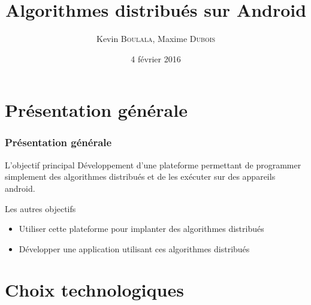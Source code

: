 \documentclass{beamer}
\title{Algorithmes distribués sur Android}
\author{Kevin \textsc{Boulala}, Maxime \textsc{Dubois}}
\institute{Université de Franche Comté}
\date{4 février 2016}
\begin{document}
  \begin{frame}
    \titlepage
  \end{frame}

  \begin{frame}
    \setcounter{tocdepth}{1}
    \tableofcontents[]
  \end{frame}
  
  \section{Présentation générale}
  \begin{frame}
    \frametitle{Présentation générale}
    \begin{block}{L'objectif principal}
      Développement d'une plateforme permettant de programmer simplement des algorithmes distribués et de les exécuter sur des appareils android.
    \end{block}
    \begin{block}{Les autres objectifs}
      \begin{itemize}
        \item Utiliser cette plateforme pour implanter des algorithmes distribués
        \item Développer une application utilisant ces algorithmes distribués
      \end{itemize}
    \end{block}
  \end{frame}
  
  \section{Choix technologiques}
  \begin{frame}
    \setcounter{tocdepth}{2}
    \tableofcontents[currentsection]
  \end{frame}
\end{document}
